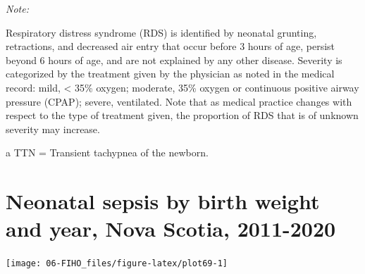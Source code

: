 \documentclass[
]{krantz}
\begin{document}
\begin{table}[H]
{\begin{threeparttable}
\begin{tablenotes}
\item \textit{Note: } 
\item Respiratory distress syndrome (RDS) is identified by neonatal grunting, retractions, and decreased air entry that occur before 3 hours of age, persist beyond 6 hours of age, and are not explained by any other disease. Severity is categorized by the treatment given by the physician as noted in the medical record: mild, < 35\% oxygen; moderate, 35\% oxygen or continuous positive airway pressure (CPAP); severe, ventilated. Note that as medical practice changes with respect to the type of treatment given, the proportion of RDS that is of unknown severity may increase.
\item[a] TTN = Transient tachypnea of the newborn.
\end{tablenotes}
\end{threeparttable}}
\end{table}

\hypertarget{section-69}{%
\section{Neonatal sepsis by birth weight and year, Nova Scotia, 2011-2020}\label{section-69}}

\begin{center}\texttt{[image: 06-FIHO\_files/figure-latex/plot69-1]} \end{center}
\end{document}
